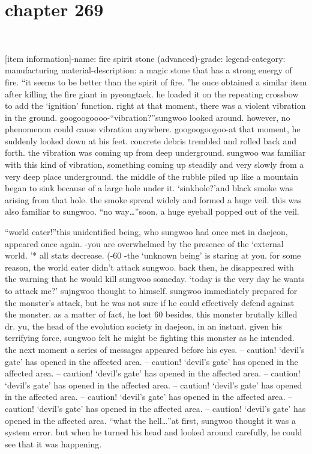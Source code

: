 \section{chapter 269}

                             




[item information]-name: fire spirit stone (advanced)-grade: legend-category: manufacturing material-description: a magic stone that has a strong energy of fire.
“it seems to be better than the spirit of fire.
”he once obtained a similar item after killing the fire giant in pyeongtaek.
he loaded it on the repeating crossbow to add the ‘ignition’ function.
right at that moment, there was a violent vibration in the ground.
googoogoooo-“vibration?”sungwoo looked around.
 however, no phenomenon could cause vibration anywhere.
googoogoogoo-at that moment, he suddenly looked down at his feet.
 concrete debris trembled and rolled back and forth.
 the vibration was coming up from deep underground.
sungwoo was familiar with this kind of vibration, something coming up steadily and very slowly from a very deep place underground.
the middle of the rubble piled up like a mountain began to sink because of a large hole under it.
‘sinkhole?’and black smoke was arising from that hole.
 the smoke spread widely and formed a huge veil.
 this was also familiar to sungwoo.
“no way…”soon, a huge eyeball popped out of the veil.

“world eater!”this unidentified being, who sungwoo had once met in daejeon, appeared once again.
-you are overwhelmed by the presence of the ‘external world.
’* all stats decrease.
 (-60%
-the ‘unknown being’ is staring at you.
for some reason, the world eater didn’t attack sungwoo.
 back then, he disappeared with the warning that he would kill sungwoo someday.
‘today is the very day he wants to attack me?’ sujngwoo thought to himself.
sungwoo immediately prepared for the monster’s attack, but he was not sure if he could effectively defend against the monster.
as a matter of fact, he lost 60%
 besides, this monster brutally killed dr.
 yu, the head of the evolution society in daejeon, in an instant.
 given his terrifying force, sungwoo felt he might be fighting this monster as he intended.
the next moment a series of messages appeared before his eyes.
– caution! ‘devil’s gate’ has opened in the affected area.
– caution! ‘devil’s gate’ has opened in the affected area.
– caution! ‘devil’s gate’ has opened in the affected area.
– caution! ‘devil’s gate’ has opened in the affected area.
– caution! ‘devil’s gate’ has opened in the affected area.
– caution! ‘devil’s gate’ has opened in the affected area.
– caution! ‘devil’s gate’ has opened in the affected area.
– caution! ‘devil’s gate’ has opened in the affected area.
“what the hell…”at first, sungwoo thought it was a system error.
 but when he turned his head and looked around carefully, he could see that it was happening.

